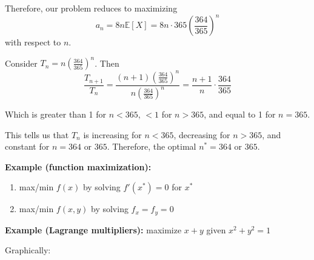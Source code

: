 \documentclass[12pt]{report}
\newcommand{\E}{\mathbb{E}}
\begin{document}
        Therefore, our problem reduces to maximizing 
        \[a_n = 8n \E[X] = 8n \cdot 365 \left(\frac{364}{365}\right)^n\]
        with respect to $n$.

        Consider $T_n = n \left(\frac{364}{365}\right)^n$. Then 
        \[\frac{T_{n+1}}{T_n} = \frac{(n + 1) \left(\frac{364}{365}\right)^n}{n\left(\frac{364}{365}\right)^n} = \frac{n + 1}{n} \cdot \frac{364}{365}\]
        
        Which is greater than 1 for $n < 365$, $< 1$ for $n > 365$, and equal to 1 for $n = 365$. 

        This tells us that $T_n$ is increasing for $n < 365$, decreasing for $n > 365$, and constant for $n = 364 \text{ or } 365$. Therefore, the optimal $n^* = 364$ or $365$.

        \textbf{Example (function maximization):} 
        \begin{enumerate}
            \item max/min $f(x)$ by solving $f'(x^*) = 0$ for $x^*$ 
            \item max/min $f(x, y)$ by solving $f_x = f_y = 0$ 
        \end{enumerate}

        \textbf{Example (Lagrange multipliers):} maximize $x + y$ given $x^2 + y^2 =1$ 

        Graphically: 
        \begin{center}
            \end{center}
\end{document}
